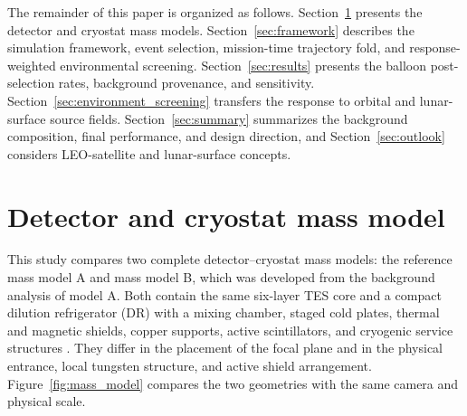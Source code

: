 \documentclass[11pt]{article}
\begin{document}
The remainder of this paper is organized as follows. Section~\ref{sec:geometry}
presents the detector and cryostat mass models. Section~\ref{sec:framework}
describes the simulation framework, event selection, mission-time trajectory
fold, and response-weighted environmental screening. Section~\ref{sec:results}
presents the balloon post-selection rates, background provenance, and
sensitivity. Section~\ref{sec:environment_screening} transfers the response to
orbital and lunar-surface source fields. Section~\ref{sec:summary} summarizes
the background composition, final performance, and design direction, and
Section~\ref{sec:outlook} considers LEO-satellite and lunar-surface concepts.

\endgroup

\section{Detector and cryostat mass model}
\label{sec:geometry}

This study compares two complete detector--cryostat mass models: the reference
mass model A and mass model B, which was developed from the background analysis
of model A. Both contain the same six-layer TES core and a compact dilution
refrigerator (DR) with a mixing chamber, staged cold plates, thermal and magnetic
shields, copper supports, active scintillators, and cryogenic service structures
\cite{Shirazi2023,Gottardi2021TESReview}. They differ in the placement of the
focal plane and in the physical entrance, local tungsten structure, and active
shield arrangement. Figure~\ref{fig:mass_model} compares the two geometries with
the same camera and physical scale.
\end{document}
